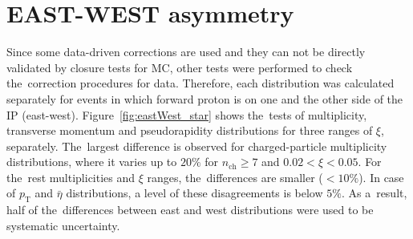 \section{EAST-WEST asymmetry}\label{section:star_eastWest}
Since some data-driven corrections are used and they can not be directly validated by closure tests for MC, other tests were performed to check the~correction procedures for data. Therefore, each distribution was calculated separately for events in which forward proton
is on one and the other side of the IP (east-west). 
Figure~\ref{fig:eastWest_star} shows the~tests of multiplicity, transverse momentum and pseudorapidity distributions for three ranges of $\xi$, separately.
The~largest difference is observed for charged-particle multiplicity distributions, where it varies up to $20\%$ for $n_\textrm{ch}\geq 7$ and $0.02 < \xi < 0.05$. 
For the~rest multiplicities and $\xi$ ranges, the~differences are smaller ($<10\%$). In case of $p_\textrm{T}$ and $\bar{\eta}$ distributions, a level of  these disagreements is  below $5\%$. As a~result,
half of the~differences between east and west distributions were used to be  systematic uncertainty.

